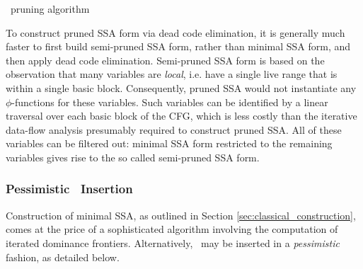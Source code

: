 \begin{algorithm}
\caption{\label{alg:classical_construction_algorithm:pruning}
\phiop\ pruning algorithm
}
\end{algorithm}

To construct pruned SSA form via dead code elimination,
it is generally much faster to first build semi-pruned SSA
form, rather than minimal SSA form, and then apply
dead code elimination.
Semi-pruned SSA form is based on the observation that
many variables are \emph{local}, i.e. have a single live range that is
within a single basic block. Consequently, pruned SSA would not 
instantiate any $\phi$-functions for these variables.
Such variables can be identified by a linear traversal
over each basic block of the CFG, which is less costly
than the iterative data-flow analysis presumably required
to construct pruned SSA. 
All of these variables
can be filtered out: minimal SSA form restricted to the remaining variables gives rise to the so called semi-pruned SSA form.




\subsubsection*{Pessimistic \phiop\ Insertion}

Construction of minimal SSA,
as outlined in Section \ref{sec:classical_construction}, 
comes at the price of a sophisticated algorithm involving 
the computation of iterated dominance frontiers. 
Alternatively, \phiops\ may be inserted in a \textit{pessimistic} fashion,
as detailed below.

